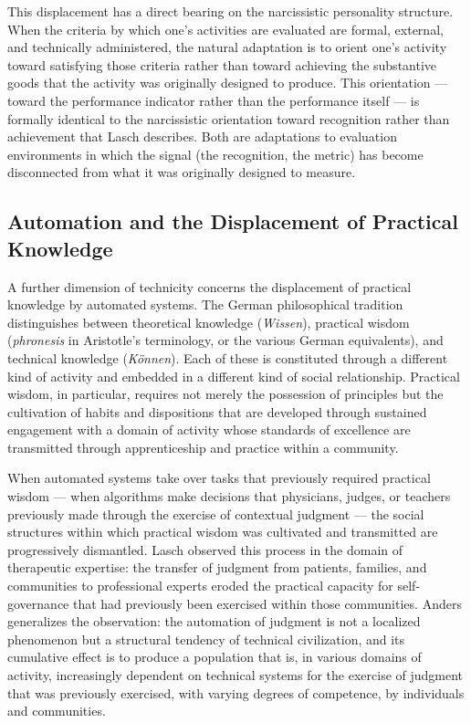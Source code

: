 \documentclass[12pt]{memoir}
\begin{document}
This displacement has a direct bearing on the narcissistic personality structure.
When the criteria by which one's activities are evaluated are formal, external, and
technically administered, the natural adaptation is to orient one's activity toward
satisfying those criteria rather than toward achieving the substantive goods that
the activity was originally designed to produce. This orientation — toward the
performance indicator rather than the performance itself — is formally identical to
the narcissistic orientation toward recognition rather than achievement that Lasch
describes. Both are adaptations to evaluation environments in which the signal
(the recognition, the metric) has become disconnected from what it was originally
designed to measure.

\subsection{Automation and the Displacement of Practical Knowledge}

A further dimension of technicity concerns the displacement of practical knowledge
by automated systems. The German philosophical tradition distinguishes between
theoretical knowledge (\textit{Wissen}), practical wisdom (\textit{phronesis} in
Aristotle's terminology, or the various German equivalents), and technical knowledge
(\textit{Können}). Each of these is constituted through a different kind of activity
and embedded in a different kind of social relationship. Practical wisdom, in
particular, requires not merely the possession of principles but the cultivation of
habits and dispositions that are developed through sustained engagement with a domain
of activity whose standards of excellence are transmitted through apprenticeship and
practice within a community.

When automated systems take over tasks that previously required practical wisdom —
when algorithms make decisions that physicians, judges, or teachers previously made
through the exercise of contextual judgment — the social structures within which
practical wisdom was cultivated and transmitted are progressively dismantled. Lasch
observed this process in the domain of therapeutic expertise: the transfer of
judgment from patients, families, and communities to professional experts eroded
the practical capacity for self-governance that had previously been exercised within
those communities. Anders generalizes the observation: the automation of judgment
is not a localized phenomenon but a structural tendency of technical civilization,
and its cumulative effect is to produce a population that is, in various domains of
activity, increasingly dependent on technical systems for the exercise of judgment
that was previously exercised, with varying degrees of competence, by individuals
and communities.
\end{document}
